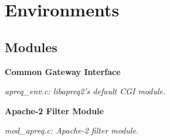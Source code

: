 \section{Environments}
\label{group__MODULES}
\subsection*{Modules}
\begin{CompactItemize}
\item 
{\bf Common Gateway Interface}
\begin{CompactList}\small\item\em apreq\_\-env.c: libapreq2's default CGI module.\item\end{CompactList}

\item 
{\bf Apache-2 Filter Module}
\begin{CompactList}\small\item\em mod\_\-apreq.c: Apache-2 filter module.\item\end{CompactList}

\end{CompactItemize}
